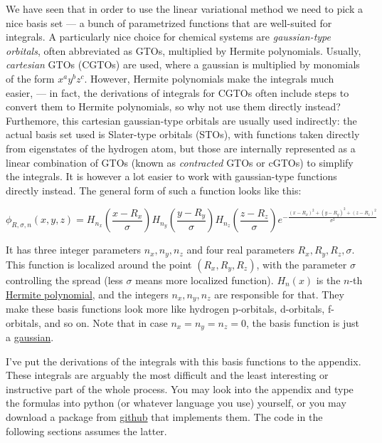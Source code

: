 \documentclass{article}
\newcommand{\githubrepo}{https://github.com/lisyarus/chembook}
\begin{document}
We have seen that in order to use the linear variational method we need to pick a nice basis set --- a bunch of parametrized functions that are well-suited for integrals. A particularly nice choice for chemical systems are \textit{gaussian-type orbitals}, often abbreviated as GTOs, multiplied by Hermite polynomials. Usually, \textit{cartesian} GTOs (CGTOs) are used, where a gaussian is multiplied by monomials of the form \(x^ay^bz^c\). However, Hermite polynomials make the integrals much easier, --- in fact, the derivations of integrals for CGTOs often include steps to convert them to Hermite polynomials, so why not use them directly instead? Furthemore, this cartesian gaussian-type orbitals are usually used indirectly: the actual basis set used is Slater-type orbitals (STOs), with functions taken directly from eigenstates of the hydrogen atom, but those are internally represented as a linear combination of GTOs (known as \textit{contracted} GTOs or cGTOs) to simplify the integrals. It is however a lot easier to work with gaussian-type functions directly instead. The general form of such a function looks like this:

\begin{equation}
\phi_{R,\sigma,n}(x,y,z) = H_{n_x}\left(\frac{x-R_x}{\sigma}\right)H_{n_y}\left(\frac{y-R_y}{\sigma}\right)H_{n_z}\left(\frac{z-R_z}{\sigma}\right) e^{-\frac{(x-R_x)^2+(y-R_y)^2+(z-R_z)^2}{\sigma^2}}
\end{equation}

It has three integer parameters \(n_x,n_y,n_z\) and four real parameters \(R_x,R_y,R_z,\sigma\). This function is localized around the point \((R_x,R_y,R_z)\), with the parameter \(\sigma\) controlling the spread (less \(\sigma\) means more localized function). \(H_n(x)\) is the \(n\)-th \href{https://en.wikipedia.org/wiki/Hermite_polynomials}{Hermite polynomial}, and the integers \(n_x,n_y,n_z\) are responsible for that. They make these basis functions look more like hydrogen p-orbitals, d-orbitals, f-orbitals, and so on. Note that in case \(n_x=n_y=n_z=0\), the basis function is just a \href{https://en.wikipedia.org/wiki/Gaussian_function}{gaussian}.

I've put the derivations of the integrals with this basis functions to the appendix. These integrals are arguably the most difficult and the least interesting or instructive part of the whole process. You may look into the appendix and type the formulas into python (or whatever language you use) yourself, or you may download a package from \href{\githubrepo/blob/master/code/hgto.py}{github} that implements them. The code in the following sections assumes the latter.
\end{document}

